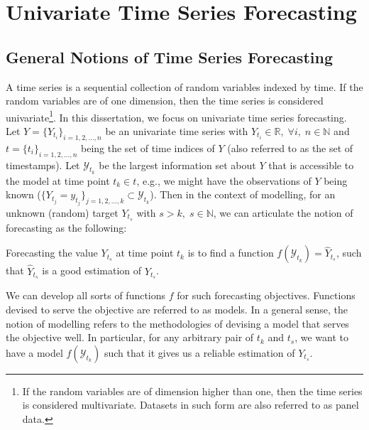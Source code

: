 \section{Univariate Time Series Forecasting}

\subsection{General Notions of Time Series Forecasting}
A time series is a sequential collection of random variables indexed by time. If the random variables are of one dimension, then the time series is considered univariate\footnote{If the random variables are of dimension higher than one, then the time series is considered multivariate. Datasets in such form are also referred to as panel data.}. In this dissertation, we focus on univariate time series forecasting. Let $Y = \{Y_{t_i} \}_{i = 1, 2, \ldots, n}$ be an univariate time series with $ Y_{t_i} \in \mathbb{R}, \; \forall i, \; n \in \mathbb{N}$ and $t = \{t_i \}_{i = 1, 2, \ldots, n}$ being the set of time indices of $Y$ (also referred to as the set of timestamps). Let $\mathcal{Y}_{t_k}$ be the largest information set about $Y$ that is accessible to the model at time point $t_k \in t$, e.g., we might have the observations of $Y$ being known ($\{Y_{t_j} = y_{t_j}\}_{j = 1, 2, \ldots, k } \subset \mathcal{Y}_{t_k}$). Then in the context of modelling, for an unknown (random) target $Y_{t_s}$ with $s > k, \; s \in \mathbb{N}$, we can articulate the notion of forecasting as the following:
\begin{displayquote}
    Forecasting the value $Y_{t_s}$ at time point $t_k$ is to find a function $f(\mathcal{Y}_{t_k}) = \widehat{Y}_{t_s}$, such that $\widehat{Y}_{t_s}$ is a good estimation of $Y_{t_s}$.
\end{displayquote}
We can develop all sorts of functions $f$ for such forecasting objectives. Functions devised to serve the objective are referred to as models. In a general sense, the notion of modelling refers to the methodologies of devising a model that serves the objective well. In particular, for any arbitrary pair of $t_k$ and $t_s$, we want to have a model $f(\mathcal{Y}_{t_k})$ such that it gives us a reliable estimation of $Y_{t_s}$.

